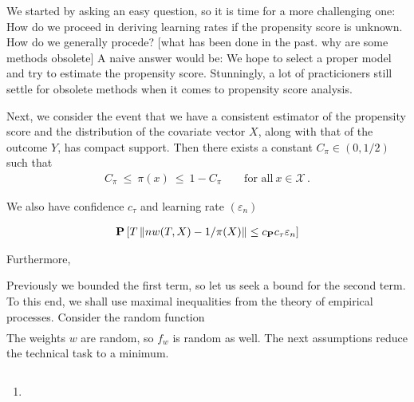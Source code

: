 We started by asking an easy question, so it is time for a more challenging one: How do we proceed in deriving learning rates if the propensity score is unknown.
How do we generally procede?
[what has been done in the past. why are some methods obsolete]
A naive answer would be: We hope to select a proper model and try to estimate the propensity score.
Stunningly, a lot of practicioners still settle for obsolete methods when it comes to propensity score analysis.


Next, we consider the event that we have a consistent estimator of the 
propensity score and the distribution of the covariate vector $X$, 
along with that of the outcome $Y$, 
has compact support.
Then there exists a constant $C_\pi\in (0,1/2)$ such that 
\begin{gather}
  C_\pi \ \le\  \pi(x) \ \le\  1-C_\pi 
  \qquad
  \text{for all}\ 
  x \in \mathcal{X}\,.
\end{gather}

We also have
confidence $c_\tau$ and learning rate $(\varepsilon_n)$

\begin{gather}
  \mathbf{P}
  \left[ 
    T
    \left\lVert
      n w(T,X)
      -
      1/\pi(X)
    \right\rVert
    \le
    c_{\mathbf{P}}
    c_{\tau}
    \varepsilon_n
  \right]
\end{gather}

Furthermore, 

Previously we bounded the first term, so let us seek a bound for the second term.
To this end, we shall use maximal inequalities from the theory of empirical processes.
Consider
the random function
\begin{gather}
\end{gather}
The weights $w$ are random, so $f_w$ is random as well. 
The next assumptions reduce the technical task to a minimum.

      $
      $
\begin{assumptions*}
  \begin{enumerate}[label={(\roman*)}]
    \item

  \end{enumerate}
\end{assumptions*}


